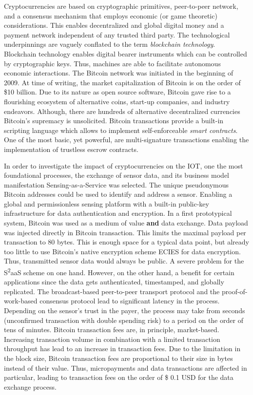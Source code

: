 Cryptocurrencies are based on cryptographic primitives, peer-to-peer network, and a consensus mechanism that employs economic (or game theoretic) considerations. This enables decentralized and global digital money and a payment network independent of any trusted third party. The technological underpinnings are vaguely conflated to the term \emph{blockchain technology}. Blockchain technology enables digital bearer instruments which can be controlled by cryptographic keys. Thus, machines are able to facilitate autonomous economic interactions. 
The Bitcoin network was initiated in the beginning of 2009. At time of writing, the market capitalization of Bitcoin is on the order of \$10 billion. Due to its nature as open source software, Bitcoin gave rise to a flourishing ecosystem of alternative coins, start-up companies, and industry endeavors. Although, there are hundreds of alternative decentralized currencies Bitcoin's supremacy is unsolicited. Bitcoin transactions provide a built-in scripting language which allows to implement self-enforceable \emph{smart contracts}. One of the most basic, yet powerful, are multi-signature transactions enabling the implementation of trustless escrow contracts.

In order to investigate the impact of cryptocurrencies on the \ac{IOT}, one the most foundational processes, the exchange of sensor data, and its business model manifestation Sensing-as-a-Service was selected. The unique pseudonymous Bitcoin addresses could be used to identify and address a sensor. Enabling a global and permissionless sensing platform with a built-in public-key infrastructure for data authentication and encryption. In a first prototypical system, Bitcoin was used as a medium of value \textbf{and} data exchange. Data payload was injected directly in Bitcoin transaction. This limits the maximal payload per transaction to 80 bytes. This is enough space for a typical data point, but already too little to use Bitcoin's native encryption scheme \ac{ECIES} for data encryption. Thus, transmitted sensor data would always be public. A severe problem for the S\textsuperscript{2}aaS scheme on one hand. However, on the other hand, a benefit for certain applications since the data gets authenticated, timestamped, and globally replicated. The broadcast-based peer-to-peer transport protocol and the proof-of-work-based consensus protocol lead to significant latency in the process. Depending on the sensor's trust in the payer, the process may take from seconds (unconfirmed transaction with double spending risk) to a period on the order of tens of minutes. Bitcoin transaction fees are, in principle, market-based. Increasing transaction volume in combination with a limited transaction throughput has lead to an increase in transaction fees. Due to the limitation in the block size, Bitcoin transaction fees are proportional to their size in bytes instead of their value. Thus, micropayments and data transactions are affected in particular, leading to transaction fees on the order of \$ 0.1 USD for the data exchange process. 

